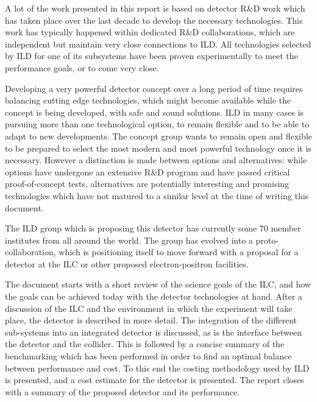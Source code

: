 A lot of the work presented in this report is based on detector R\&D work which has taken place over the last decade to develop the necessary technologies. 
This work has typically happened within dedicated R\&D collaborations, which are independent but maintain very close connections to ILD. All technologies selected by ILD for one of its subsystems have been proven experimentally to meet the performance goals, or to come very close. 

Developing a very powerful detector concept over a long period of time requires balancing cutting edge technologies, which might become available while the concept is being developed, with safe and sound solutions. ILD in many cases is pursuing more than one technological option, to remain flexible and to be able to adapt to new developments. The concept group  wants to remain open and flexible to be prepared to select the most modern and most powerful technology once it is necessary. 
However a distinction is made between options and alternatives: while options have undergone an extensive R\&D program and have passed critical proof-of-concept tests, alternatives are potentially interesting and promising technologies which have not matured to a similar level at the time of writing this document. 

The ILD group which is proposing this detector has currently some 70 member institutes from all around the world. The group has evolved into a proto-collaboration, which is positioning itself to move forward with a proposal for a detector at the ILC or other proposed electron-positron facilities.

The document starts with a short review of the science goals of the ILC, and how the goals can be achieved today with the detector technologies at hand. After a discussion of the ILC and the environment in which the experiment will take place, the detector is described in more detail. The integration of the different sub-systems into an integrated detector is discussed, as is the interface between the detector and the collider. This is followed by a concise summary of the benchmarking which has been performed in order to find an optimal balance between performance and cost. To this end the costing methodology used by ILD is presented, and a cost estimate for the detector is presented. The report closes with a summary of the proposed detector and its performance. 
